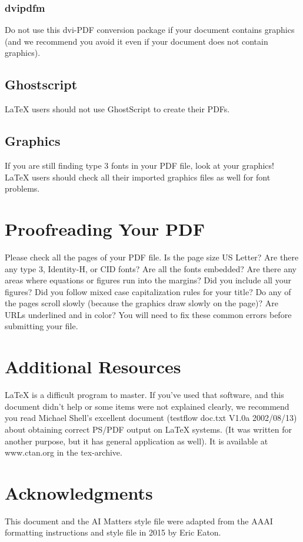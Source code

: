 \documentclass[letterpaper]{article}
\begin{document}
\subsubsection{dvipdfm}
Do not use this dvi-PDF conversion package if your document contains graphics (and we recommend you avoid it even if your document does not contain graphics).

\subsection{Ghostscript}
\LaTeX{} users should not use GhostScript to create their PDFs.

\subsection{Graphics}
If you are still finding type 3 fonts in your PDF file, look at your graphics! \LaTeX{} users should check all their imported graphics files as well for font problems.

\section{Proofreading Your PDF}
Please check all the pages of your PDF file. Is the page size US Letter? Are there any type 3, Identity-H, or CID fonts? Are all the fonts embedded? Are there any areas where equations or figures run into the margins? Did you include all your figures? Did you follow mixed case capitalization rules for your title? Do any of the pages scroll slowly (because the graphics draw slowly on the page)? Are URLs underlined and in color? You will need to fix these common errors before submitting your file. 



\section{Additional Resources}
\LaTeX{} is a difficult program to master. If you've used that software, and this document didn't help or some items were not explained clearly, we recommend you read Michael Shell's excellent document (testflow doc.txt V1.0a 2002/08/13) about obtaining correct PS/PDF output on \LaTeX{} systems. (It was written for another purpose, but it has general application as well). It is available at www.ctan.org in the tex-archive.

\section{ Acknowledgments}
This document and the AI Matters style file were adapted from the AAAI formatting instructions and style file in 2015 by Eric Eaton.
\end{document}
